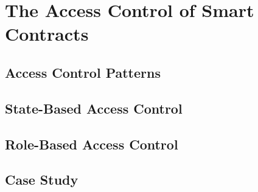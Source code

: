 \chapter{The Access Control of Smart Contracts}
\section{Access Control Patterns}
\section{State-Based Access Control}
\section{Role-Based Access Control}
\section{Case Study}
